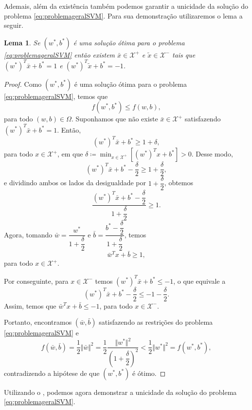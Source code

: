 \documentclass[12pt,a4paper]{scrartcl}
\def\Xset{\mathcal{X}}
\def\xbar{\bar{x}}
\newtheorem{lema}{Lema}
\theoremstyle{definition}%
\begin{document}
Ademais, além da existência também podemos garantir a unicidade da solução do problema \eqref{eq:problemageralSVM}. Para sua demonstração utilizaremos o lema a seguir.

\begin{lema} \label{lema:solucao_otima_SVM_margens}
Se $(w^{*}, b^{*})$ é uma solução ótima para o problema \eqref{eq:problemageralSVM} então existem $\xbar \in \Xset^{+}$ e $\tilde{x} \in \Xset^{-}$ tais que $(w^{*})^{T}\xbar + b^{*} = 1$ e $(w^{*})^{T}\tilde{x} + b^{*} = -1$.
\end{lema}
\begin{proof}
Como $(w^{*}, b^{*})$ é uma solução ótima para o problema \eqref{eq:problemageralSVM}, temos que
\[
f(w^{*}, b^{*}) \leq f(w, b),
\]
para todo $(w, b) \in \Omega$. Suponhamos que não existe $\xbar \in \Xset^{+}$ satisfazendo $(w^{*})^{T}\xbar + b^{*} = 1$. Então, 
\[
(w^{*})^{T}\xbar + b^{*} \geq 1 + \delta ,
\]
para todo $x \in \Xset^{+}$, em que $\delta \coloneqq \min_{x \in \Xset^{+}} [(w^{*})^{T}x + b^{*}] > 0$. Desse modo, 
\[
(w^{*})^{T}\xbar + b^{*} -\dfrac{\delta}{2} \geq 1 + \dfrac{\delta}{2},
\]
e dividindo ambos os lados da desigualdade por $1+\dfrac{\delta}{2}$, obtemos
\[
\dfrac{(w^{*})^{T}\xbar + b^{*} -\dfrac{\delta}{2}}{1 + \dfrac{\delta}{2}} \geq 1.
\]
Agora, tomando $\bar{w} = \dfrac{w^{*}}{1 + \dfrac{\delta}{2}}$ e $\bar{b} = \dfrac{b^{*} - \dfrac{\delta}{2}}{1 + \dfrac{\delta}{2}}$, temos
\[
\bar{w}^{T}x + \bar{b} \geq 1,
\]
para todo $x \in \Xset^{+}$.

Por conseguinte, para $x \in \Xset^{-}$ temos $(w^{*})^{T}\xbar + b^{*} \leq -1$, o que equivale a 
\[
(w^{*})^{T}\xbar + b^{*} -\dfrac{\delta}{2} \leq -1 - \dfrac{\delta}{2}.
\]
Assim, temos que $\bar{w}^{T}x + \bar{b} \leq -1$, para todo $x \in \Xset^{-}$.

Portanto, encontramos $(\bar{w}, \bar{b})$ satisfazendo as restrições do problema \eqref{eq:problemageralSVM} e 
\[
f(\bar{w}, \bar{b}) = \dfrac{1}{2}\Vert \bar{w} \Vert^{2} = \dfrac{1}{2} \dfrac{\Vert w^{*} \Vert^{2}}{\left( 1 + \dfrac{\delta}{2}\right)^{2}} < \dfrac{1}{2}\Vert w^{*} \Vert^{2} = f(w^{*}, b^{*}),
\]
contradizendo a hipótese de que $(w^{*}, b^{*})$ é ótimo.
\end{proof}

Utilizando o , podemos agora demonstrar a unicidade da solução do problema \eqref{eq:problemageralSVM}.
\end{document}
